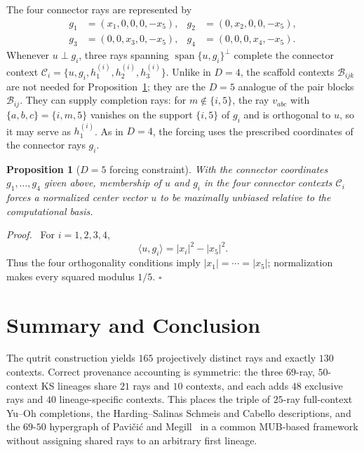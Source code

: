 \documentclass[%
  reprint,
  superscriptaddress,
  showkeys,
  amsmath,amssymb,
  aps,pra,
  longbibliography,
  floatfix,
  x11names
]{revtex4-2}
\newtheorem{proposition}{Proposition}
\newenvironment{proof}{\par\noindent\textit{Proof.}\ }{\hfill$\square$\par}
\begin{document}
The four connector rays are represented by
\begin{align*}
g_1&=(x_1,0,0,0,-x_5),&
g_2&=(0,x_2,0,0,-x_5),\\
g_3&=(0,0,x_3,0,-x_5),&
g_4&=(0,0,0,x_4,-x_5).
\end{align*}
Whenever $u\perp g_i$, three rays spanning $\operatorname{span}\{u,g_i\}^{\perp}$ complete the connector context $\mathcal{C}_i=\{u,g_i,h^{(i)}_1,h^{(i)}_2,h^{(i)}_3\}$.
Unlike in $D=4$, the scaffold contexts $\mathcal{B}_{ijk}$ are not needed for Proposition~\ref{prop:D5forcing}; they are the $D=5$ analogue of the pair blocks $\mathcal{B}_{ij}$.  They can supply completion rays: for $m\notin\{i,5\}$, the ray $v_{abc}$ with $\{a,b,c\}=\{i,m,5\}$ vanishes on the support $\{i,5\}$ of $g_i$ and is orthogonal to $u$, so it may serve as $h^{(i)}_1$.  As in $D=4$, the forcing uses the prescribed coordinates of the connector rays $g_i$.

\begin{proposition}[$D=5$ forcing constraint]
\label{prop:D5forcing}
With the connector coordinates $g_1,\ldots,g_4$ given above, membership of $u$ and $g_i$ in the four connector contexts $\mathcal{C}_i$ forces a normalized center vector $u$ to be maximally unbiased relative to the computational basis.
\end{proposition}

\begin{proof}
For $i=1,2,3,4$,
\[
\langle u,g_i\rangle=|x_i|^2-|x_5|^2.
\]
Thus the four orthogonality conditions imply \ensuremath{|x_1|=\cdots=|x_5|};
normalization makes every squared modulus $1/5$.
\end{proof}

\section{Summary and Conclusion}


The qutrit construction yields $165$ projectively distinct rays and exactly $130$ contexts.  Correct provenance accounting is symmetric: the three $69$-ray, $50$-context KS lineages share $21$ rays and $10$ contexts, and each adds $48$ exclusive rays and $40$ lineage-specific contexts.  This places the triple of $25$-ray full-context Yu--Oh completions, the Harding--Salinas Schmeis and Cabello descriptions, and the $69$-$50$ hypergraph of Pavi\v{c}i\'{c} and Megill~\cite{pavicic-megill-2022,Pavicic_2023} in a common MUB-based framework without assigning shared rays to an arbitrary first lineage.
\end{document}
